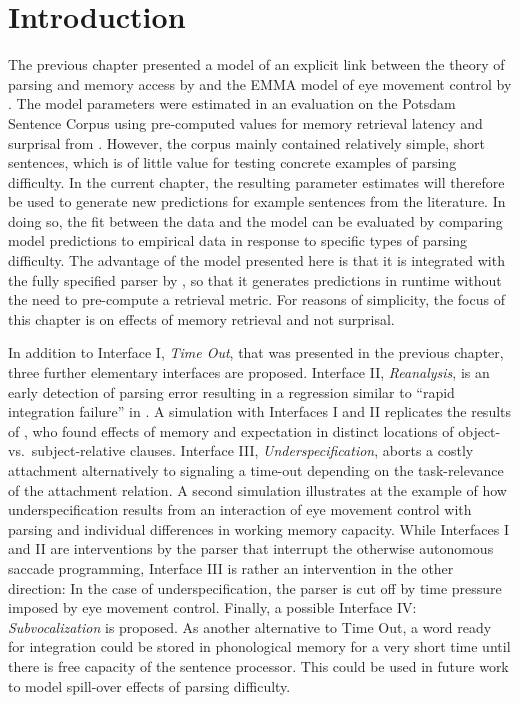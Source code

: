 \documentclass{cambridge7A}\usepackage[]{graphicx}\usepackage[]{color}
\begin{document}
\section{Introduction}



The previous chapter presented a model of an explicit link between the theory of parsing and memory access by \cite{LewisVasishth2005} and the EMMA model of eye movement control by \cite{Salvucci2001}.
The model parameters were estimated in an evaluation on the Potsdam Sentence Corpus \citep{Kliegl2004} using pre-computed values for memory retrieval latency and surprisal from \cite{BostonHaleVasishth2011}. However, the corpus mainly contained relatively simple, short sentences, which is of little value for testing concrete examples of parsing difficulty. In the current chapter, the resulting parameter estimates will therefore be used to generate new predictions for example sentences from the literature. In doing so, the fit between the data and the model can be evaluated by comparing model predictions to empirical data in response to specific types of parsing difficulty. 
The advantage of the model presented here is that it is integrated with the fully specified parser by \cite{LewisVasishth2005}, so that it generates predictions in runtime without the need to pre-compute a retrieval metric. For reasons of simplicity, the focus of this chapter is on effects of memory retrieval and not surprisal.

In addition to Interface I, \emph{Time Out}, that was presented in the previous chapter, three further elementary interfaces are proposed. Interface II, \emph{Reanalysis}, is an early detection of parsing error resulting in a regression similar to ``rapid integration failure'' in \cite{ReichleWarrenMcConnell2009}.
A simulation with Interfaces I and II replicates the results of \cite{Staub2010a}, who found effects of memory and expectation in distinct locations of object- vs.\ subject-relative clauses. 
Interface III, \emph{Underspecification}, aborts a costly attachment alternatively to signaling a time-out depending on the task-relevance of the attachment relation.
A second simulation illustrates at the example of \cite{MalsburgVasishth2013} how underspecification results from an interaction of eye movement control with parsing and individual differences in working memory capacity.
While Interfaces I and II are interventions by the parser that interrupt the otherwise autonomous saccade programming, Interface III is rather an intervention in the other direction: In the case of underspecification, the parser is cut off by time pressure imposed by eye movement control.
Finally, a possible Interface IV: \emph{Subvocalization} is proposed. As another alternative to Time Out, a word ready for integration could be stored in phonological memory \citep{BaddeleyHitch1974,Baddeley2003} for a very short time until there is free capacity of the sentence processor. This could be used in future work to model spill-over effects of parsing difficulty.
\end{document}
